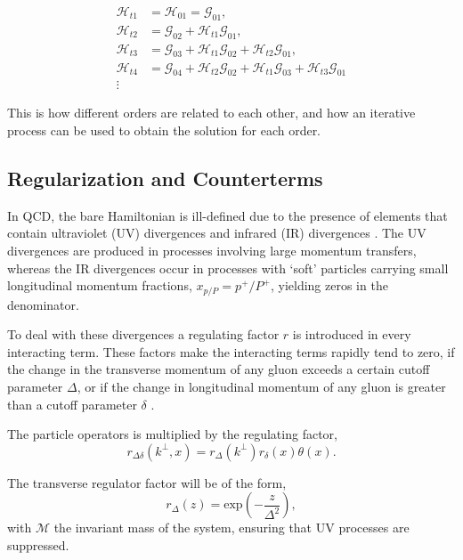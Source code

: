 \documentclass[11pt,a4paper,twoside,pdf]{article}
\numberwithin{equation}{section}
\begin{document}
\begin{align}
    \mathcal{H}_{t1} & = \mathcal{H}_{01} = \mathcal{G}_{01}, \\
    \mathcal{H}_{t2} & = \mathcal{G}_{02} + \mathcal{H}_{t1} \mathcal{G}_{01}, \\
    \mathcal{H}_{t3} & = \mathcal{G}_{03} + \mathcal{H}_{t1} \mathcal{G}_{02} + 
    \mathcal{H}_{t2} \mathcal{G}_{01}, \\
    \mathcal{H}_{t4} & = \mathcal{G}_{04} + \mathcal{H}_{t2} \mathcal{G}_{02} + 
    \mathcal{H}_{t1} \mathcal{G}_{03} + \mathcal{H}_{t3} \mathcal{G}_{01} \label{eq:sol_order4}\\
    \vdots & \nonumber
\end{align}

This is how different orders are related to each other, and how an iterative 
process can be used to obtain the solution for each order.

\subsection{Regularization and Counterterms}\label{sec:regulatrization_countertems}

In QCD, the bare Hamiltonian is ill-defined due to the presence of elements 
that contain ultraviolet (UV) divergences and infrared (IR) divergences
\cite{QCDG,glazek_renormalization_1993}.
The UV divergences are produced in processes involving large momentum transfers, 
whereas the IR divergences occur in processes with ‘soft’ particles carrying small 
longitudinal momentum fractions, $x_{p/P} = p^+/P^+$, yielding zeros in the 
denominator.

To deal with these divergences a regulating factor $r$ is 
introduced in every interacting term. These factors make the interacting terms rapidly 
tend to zero, if the change in the transverse momentum of any gluon exceeds a certain
cutoff parameter $\Delta$, or if the change in longitudinal momentum of any gluon is
greater than a cutoff parameter $\delta$ \cite{Collins_1984}. 

The particle operators is multiplied by the regulating factor, 
\begin{equation}
    r_{\Delta \delta} (k^\perp, x) = r_\Delta (k^\perp) r_\delta(x) \theta(x).
\end{equation}

The transverse regulator factor will be of the form, 
\begin{equation}
    r_\Delta (z) = \text{exp} \left( -\frac{z}{\Delta^2} \right),
\end{equation}
with $\mathcal{M}$ the invariant mass of the system, ensuring that UV processes are
suppressed.
\end{document}
